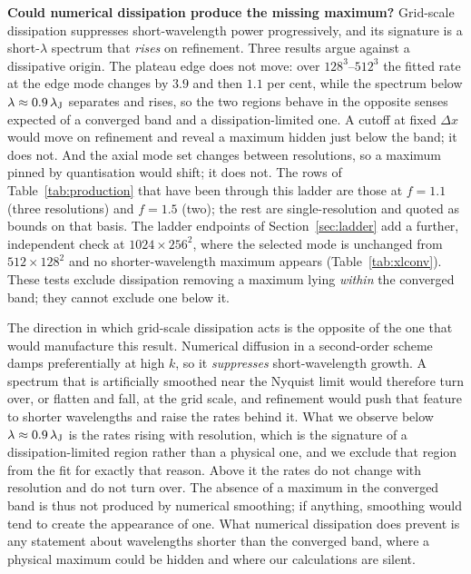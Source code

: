 \documentclass[usenatbib,twoside,twocolumn]{mnras}
\begin{document}
\smallskip\noindent\textbf{Could numerical dissipation produce the missing maximum?} Grid-scale dissipation suppresses short-wavelength power progressively, and its signature is a short-$\lambda$ spectrum that \emph{rises} on refinement. Three results argue against a dissipative origin. The plateau edge does not move: over $128^3$--$512^3$ the fitted rate at the edge mode changes by $3.9$ and then $1.1$ per cent, while the spectrum below $\lambda\approx0.9\,\lambda_{\rm J}$ separates and rises, so the two regions behave in the opposite senses expected of a converged band and a dissipation-limited one. A cutoff at fixed $\Delta x$ would move on refinement and reveal a maximum hidden just below the band; it does not. And the axial mode set changes between resolutions, so a maximum pinned by quantisation would shift; it does not. The rows of Table~\ref{tab:production} that have been through this ladder are those at $f=1.1$ (three resolutions) and $f=1.5$ (two); the rest are single-resolution and quoted as bounds on that basis. The ladder endpoints of Section~\ref{sec:ladder} add a further, independent check at $1024\times256^2$, where the selected mode is unchanged from $512\times128^2$ and no shorter-wavelength maximum appears (Table~\ref{tab:xlconv}). These tests exclude dissipation removing a maximum lying \emph{within} the converged band; they cannot exclude one below it.

The direction in which grid-scale dissipation acts is the opposite of the one that would manufacture this result. Numerical diffusion in a second-order scheme damps preferentially at high $k$, so it \emph{suppresses} short-wavelength growth. A spectrum that is artificially smoothed near the Nyquist limit would therefore turn over, or flatten and fall, at the grid scale, and refinement would push that feature to shorter wavelengths and raise the rates behind it. What we observe below $\lambda\approx0.9\,\lambda_{\rm J}$ is the rates rising with resolution, which is the signature of a dissipation-limited region rather than a physical one, and we exclude that region from the fit for exactly that reason. Above it the rates do not change with resolution and do not turn over. The absence of a maximum in the converged band is thus not produced by numerical smoothing; if anything, smoothing would tend to create the appearance of one. What numerical dissipation does prevent is any statement about wavelengths shorter than the converged band, where a physical maximum could be hidden and where our calculations are silent.
\end{document}
